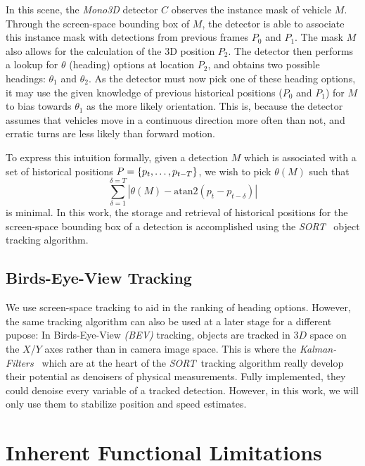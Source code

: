 In this scene, the \textit{Mono3D} detector $C$ observes the instance mask of vehicle $M$.
Through the screen-space bounding box of $M$, the detector is able to associate this instance mask with detections from previous frames \textemdash $P_0$ and $P_1$.
The mask $M$ also allows for the calculation of the 3D position $P_2$.
The detector then performs a lookup for $\theta$ (heading) options at location $P_2$, and obtains two possible headings: $\theta_1$ and $\theta_2$.
As the detector must now pick one of these heading options, it may use the given knowledge of previous historical positions ($P_0$ and $P_1$) for $M$ to bias towards $\theta_1$ as the more likely orientation.
This is, because the detector assumes that vehicles move in a continuous direction more often than not, and erratic turns are less likely than forward motion.

To express this intuition formally, given a detection $M$ which is associated with a set of historical positions $P=\{p_{t},\mathellipsis,p_{t-T}\}$, we wish to pick $\theta(M)$ such that \[\sum_{\delta=1}^{\delta=T} |\theta(M) - \text{atan2}(p_t - p_{t-\delta})|\] is minimal.
In this work, the storage and retrieval of historical positions for the screen-space bounding box of a detection is accomplished using the \textit{SORT}~\cite{bewley2016simple} object tracking algorithm.

\subsection{Birds-Eye-View Tracking}
\label{subsec:bevtracking}

We use screen-space tracking to aid in the ranking of heading options.
However, the same tracking algorithm can also be used at a later stage for a different pupose:
In Birds-Eye-View \textit{(BEV)} tracking, objects are tracked in $3D$ space on the $X$/$Y$ axes rather than in camera image space.
This is where the \textit{Kalman-Filters}~\cite{welch1995kalman} which are at the heart of the \textit{SORT}~tracking algorithm really develop their potential as denoisers of physical measurements.
Fully implemented, they could denoise every variable of a tracked detection.
However, in this work, we will only use them to stabilize position and speed estimates.

\section{Inherent Functional Limitations}
\label{sec:limits}

